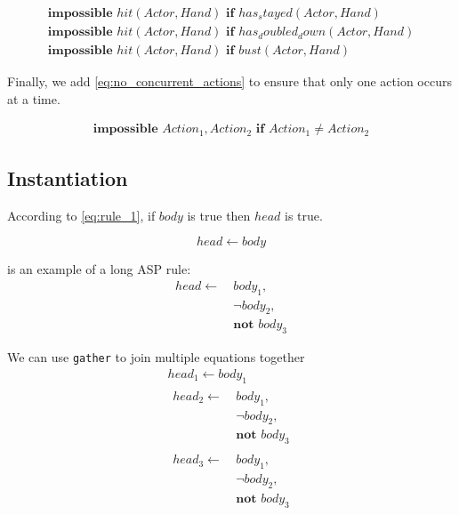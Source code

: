 \documentclass{article}
\begin{document}
\begin{gather}
    \label{eq:impossible_hit_1}
    \textbf{impossible } hit(Actor, Hand) \textbf{ if } has_stayed(Actor, Hand) \\
    \label{eq:impossible_hit_2}
    \textbf{impossible } hit(Actor, Hand) \textbf{ if } has_doubled_down(Actor, Hand) \\
    \label{eq:impossible_hit_3}
    \textbf{impossible } hit(Actor, Hand) \textbf{ if } bust(Actor, Hand)
\end{gather}

Finally, we add \cref{eq:no_concurrent_actions} to ensure that only one action occurs at a time.

\begin{gather}
    \label{eq:no_concurrent_actions}
    \textbf{impossible } Action_1, Action_2 \textbf{ if } Action_1 \neq Action_2
\end{gather}

\subsection{Instantiation}


According to \cref{eq:rule_1}, if $body$ is true then $head$ is true.

\begin{equation}
    \label{eq:rule_1}
    head \leftarrow body
\end{equation}

 is an example of a long ASP rule:
\begin{equation}
\begin{split}
    \label{eq:rule_2}
    head \leftarrow \
        & body_1, \\
        & \neg body_2, \\
        & \textbf{not } body_3
\end{split}
\end{equation}

We can use \texttt{gather} to join multiple equations together
\begin{gather}
    \label{eq:rule_3}
    head_1 \leftarrow body_1 \\
    \begin{split}
        \label{eq:rule_4}
        head_2 \leftarrow \
            & body_1, \\
            & \neg body_2, \\
            & \textbf{not } body_3
    \end{split} \\
    \begin{split}
        \label{eq:rule_5}
        head_3 \leftarrow \
            & body_1, \\
            & \neg body_2, \\
            & \textbf{not } body_3
    \end{split}
\end{gather}
\end{document}
